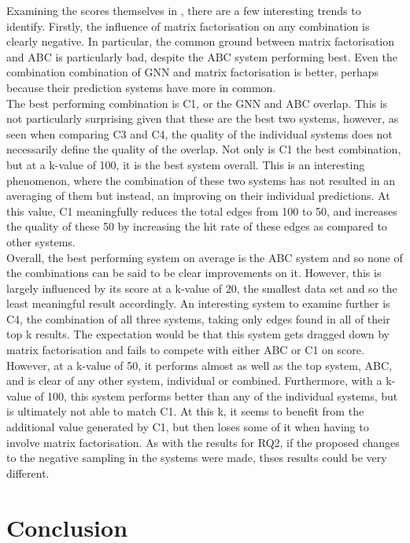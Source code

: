 \documentclass{l4proj}
\begin{document}
Examining the scores themselves in , there are a few interesting trends to identify. Firstly, the influence of matrix factorisation on any combination is clearly negative. In particular, the common ground between matrix factorisation and ABC is particularly bad, despite the ABC system performing best. Even the combination combination of GNN and matrix factorisation is better, perhaps because their prediction systems have more in common. \\

The best performing combination is C1, or the GNN and ABC overlap. This is not particularly surprising given that these are the best two systems, however, as seen when comparing C3 and C4, the quality of the individual systems does not necessarily define the quality of the overlap. Not only is C1 the best combination, but at a k-value of 100, it is the best system overall. This is an interesting phenomenon, where the combination of these two systems has not resulted in an averaging of them but instead, an improving on their individual predictions. At this value, C1 meaningfully reduces the total edges from 100 to 50, and increases the quality of these 50 by increasing the hit rate of these edges as compared to other systems. \\

Overall, the best performing system on average is the ABC system and so none of the combinations can be said to be clear improvements on it. However, this is largely influenced by its score at a k-value of 20, the smallest data set and so the least meaningful result accordingly. An interesting system to examine further is C4, the combination of all three systems, taking only edges found in all of their top k results. The expectation would be that this system gets dragged down by matrix factorisation and fails to compete with either ABC or C1 on score. However, at a k-value of 50, it performs almost as well as the top system, ABC, and is clear of any other system, individual or combined. Furthermore, with a k-value of 100, this system performs better than any of the individual systems, but is ultimately not able to match C1. At this k, it seems to benefit from the additional value generated by C1, but then loses some of it when having to involve matrix factorisation. As with the results for RQ2, if the proposed changes to the negative sampling in the systems were made, thses results could be very different. \\

\chapter{Conclusion}    
\end{document}
